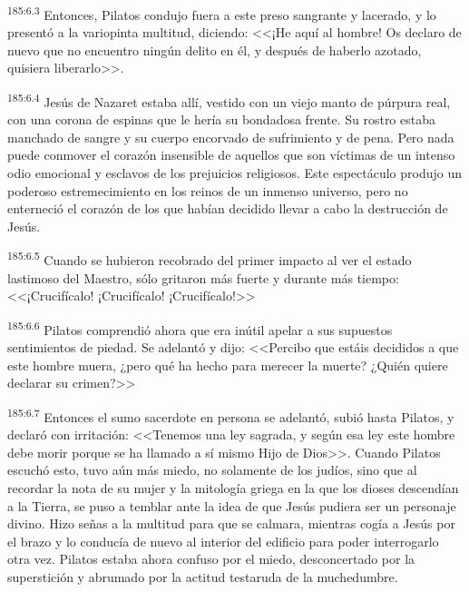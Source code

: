 \par 
\textsuperscript{185:6.3} Entonces, Pilatos condujo fuera a este preso sangrante y lacerado, y lo presentó a la variopinta multitud, diciendo: <<¡He aquí al hombre! Os declaro de nuevo que no encuentro ningún delito en él, y después de haberlo azotado, quisiera liberarlo>>.

\par 
\textsuperscript{185:6.4} Jesús de Nazaret estaba allí, vestido con un viejo manto de púrpura real, con una corona de espinas que le hería su bondadosa frente. Su rostro estaba manchado de sangre y su cuerpo encorvado de sufrimiento y de pena. Pero nada puede conmover el corazón insensible de aquellos que son víctimas de un intenso odio emocional y esclavos de los prejuicios religiosos. Este espectáculo produjo un poderoso estremecimiento en los reinos de un inmenso universo, pero no enterneció el corazón de los que habían decidido llevar a cabo la destrucción de Jesús.

\par 
\textsuperscript{185:6.5} Cuando se hubieron recobrado del primer impacto al ver el estado lastimoso del Maestro, sólo gritaron más fuerte y durante más tiempo: <<¡Crucifícalo! ¡Crucifícalo! ¡Crucifícalo!>>

\par 
\textsuperscript{185:6.6} Pilatos comprendió ahora que era inútil apelar a sus supuestos sentimientos de piedad. Se adelantó y dijo: <<Percibo que estáis decididos a que este hombre muera, ¿pero qué ha hecho para merecer la muerte? ¿Quién quiere declarar su crimen?>>

\par 
\textsuperscript{185:6.7} Entonces el sumo sacerdote en persona se adelantó, subió hasta Pilatos, y declaró con irritación: <<Tenemos una ley sagrada, y según esa ley este hombre debe morir porque se ha llamado a sí mismo Hijo de Dios>>. Cuando Pilatos escuchó esto, tuvo aún más miedo, no solamente de los judíos, sino que al recordar la nota de su mujer y la mitología griega en la que los dioses descendían a la Tierra, se puso a temblar ante la idea de que Jesús pudiera ser un personaje divino. Hizo señas a la multitud para que se calmara, mientras cogía a Jesús por el brazo y lo conducía de nuevo al interior del edificio para poder interrogarlo otra vez. Pilatos estaba ahora confuso por el miedo, desconcertado por la superstición y abrumado por la actitud testaruda de la muchedumbre.

